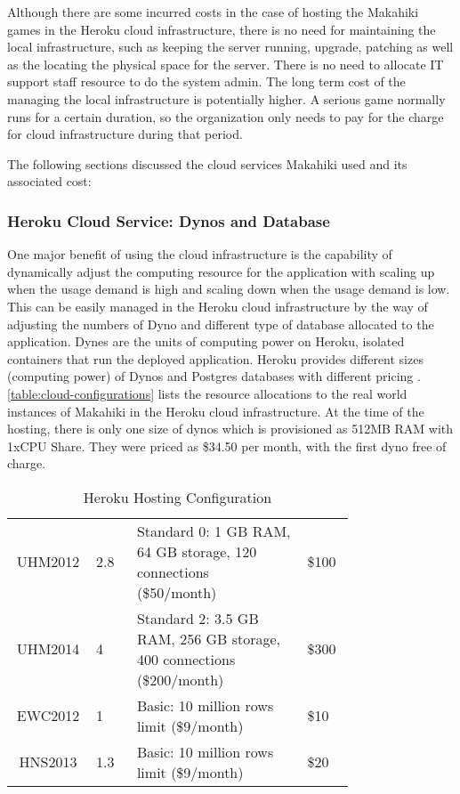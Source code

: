 Although there are some incurred costs in the case of hosting the Makahiki games in the Heroku cloud infrastructure, there is no need for maintaining the local infrastructure, such as keeping the server running, upgrade, patching as well as the locating the physical space for the server. There is no need to allocate IT support staff resource to do the system admin. The long term cost of the managing the local infrastructure is potentially higher. A serious game normally runs for a certain duration, so the organization only needs to pay for the charge for cloud infrastructure during that period.   

The following sections discussed the cloud services Makahiki used and its associated cost:

\subsubsection{Heroku Cloud Service: Dynos and Database}

One major benefit of using the cloud infrastructure is the capability of dynamically adjust the computing resource for the application with scaling up when the usage demand is high and scaling down when the usage demand is low. This can be easily managed in the Heroku cloud infrastructure by the way of adjusting the numbers of Dyno and different type of database allocated to the application. Dynes are the units of computing power on Heroku, isolated containers that run the deployed application. Heroku provides different sizes (computing power) of Dynos and Postgres databases with different pricing \cite{heroku-pricing}. \autoref{table:cloud-configurations} lists the resource allocations to the real world instances of Makahiki in the Heroku cloud infrastructure. At the time of the hosting, there is only one size of dynos which is provisioned as 512MB RAM with 1xCPU Share. They were priced as \$34.50 per month, with the first dyno free of charge.

\begin{table}[ht!]
  \centering
  \begin{tabular} {|c|P{0.12\linewidth}|P{0.5\linewidth}|P{0.14\linewidth}|}
    \hline
     &
     &
     &
     \\
    \hline
    UHM2012 & 2.8 & Standard 0:  1 GB RAM, 64 GB storage, 120 connections (\$50/month) & \$100 \\
    \hline
    UHM2014 & 4 & Standard 2: 3.5 GB RAM, 256 GB storage, 400 connections (\$200/month) & \$300 \\
    \hline
    EWC2012 & 1 & Basic: 10 million rows limit (\$9/month) & \$10 \\
    \hline
    HNS2013 & 1.3 & Basic: 10 million rows limit (\$9/month) & \$20 \\
    \hline
  \end{tabular}
  \caption{Heroku Hosting Configuration}
  \label{table:cloud-configurations}
\end{table}

